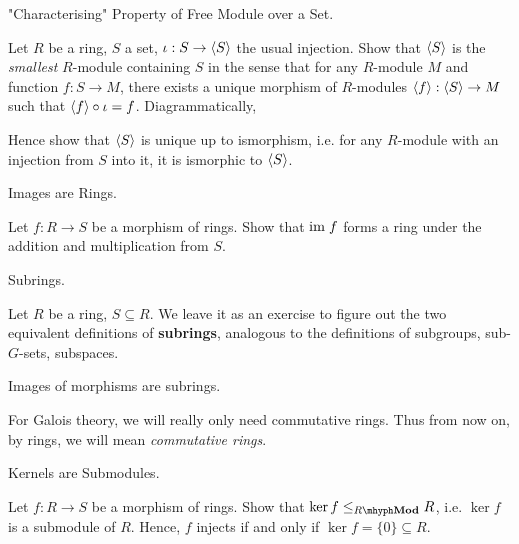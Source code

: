 \documentclass[../book.tex]{subfiles}
\begin{document}
\begin{ex} [Skippable] "Characterising" Property of Free Module over a Set. 

    Let $R$ be a ring, $S$ a set, $\iota : S \to \langle S\rangle$ the usual injection.
    Show that $\langle S\rangle$ is the \emph{smallest} $R$-module containing $S$
    in the sense that for any $R$-module $M$ and function $f : S \to M$, 
    there exists a unique morphism of $R$-modules
    $\langle f\rangle : \langle S\rangle \to M$ such that $\langle f\rangle \circ \iota = f$. 
    Diagrammatically, 
    \begin{figure} [ht]
        \centering
    \end{figure}
    
    Hence show that $\langle S\rangle$ is unique up to ismorphism, i.e.
    for any $R$-module with an injection from $S$ into it, 
    it is ismorphic to $\langle S\rangle$. 
\end{ex}

\begin{ex} [Important] Images are Rings. 

    Let $f : R \to S$ be a morphism of rings. 
    Show that $\textnormal{im}\; f$ forms a ring under the addition and multiplication from $S$. 
\end{ex}

\begin{dfn} Subrings. 

    Let $R$ be a ring, $S \subseteq R$. 
    We leave it as an exercise to figure out the two equivalent definitions
    of \textbf{subrings}, analogous to 
    the definitions of subgroups, sub-$G$-sets, subspaces. 
    
    Images of morphisms are subrings. 
\end{dfn}

\begin{rmk}
    For Galois theory, we will really only need commutative rings. 
    Thus from now on, by rings, we will mean \emph{commutative rings}. 
\end{rmk}

\begin{ex} [Important] Kernels are Submodules.

    Let $f : R \to S$ be a morphism of rings. 
    Show that $\ker f \leq_{\RMod} R$, i.e. $\ker f$ is a submodule of $R$.
    Hence, $f$ injects if and only if $\ker f = \{0\} \subseteq R$.  
\end{ex}
\end{document}
